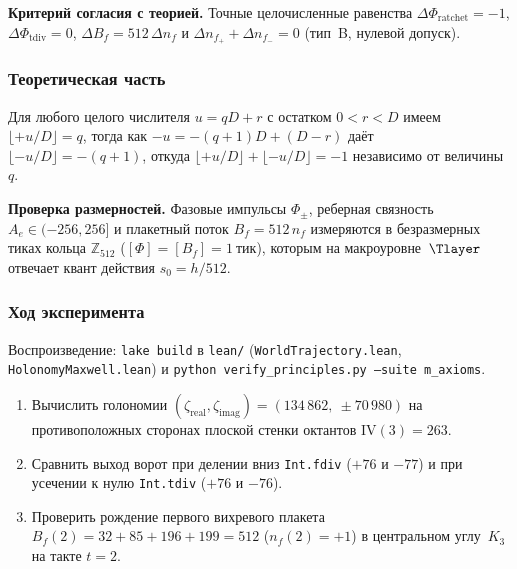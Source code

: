\textbf{Критерий согласия с теорией.}
Точные целочисленные равенства $\Delta\Phi_{\mathrm{ratchet}} = -1$, $\Delta\Phi_{\mathrm{tdiv}} = 0$, $\Delta B_f = 512\,\Delta n_f$ и $\Delta n_{f_+} + \Delta n_{f_-} = 0$ (тип~B, нулевой допуск).

\subsubsection*{Теоретическая часть}
Для любого целого числителя $u = qD + r$ с остатком $0 < r < D$ имеем $\lfloor +u/D\rfloor = q$, тогда как $-u = -(q+1)D + (D-r)$ даёт $\lfloor -u/D\rfloor = -(q+1)$, откуда $\lfloor +u/D\rfloor + \lfloor -u/D\rfloor = -1$ независимо от величины~$q$.

\textbf{Проверка размерностей.}
Фазовые импульсы $\Phi_\pm$, реберная связность $A_e \in (-256,256]$ и плакетный поток $B_f = 512\,n_f$ измеряются в безразмерных тиках кольца $\mathbb{Z}_{512}$ ($[\Phi] = [B_f] = 1\ \text{тик}$), которым на макроуровне~$\Tlayer$ отвечает квант действия $s_0 = h / 512$.

\subsubsection*{Ход эксперимента}
{\sloppy Воспроизведение: \texttt{lake build} в \texttt{lean/} (\texttt{WorldTrajectory.lean}, \texttt{HolonomyMaxwell.lean}) и \texttt{python verify\_principles.py --suite m\_axioms}.\par}

\begin{enumerate}[label=\textbf{Шаг \arabic*:},leftmargin=*,itemsep=0.35em]
\item Вычислить голономии $(\zeta_{\mathrm{real}},\zeta_{\mathrm{imag}}) = (134\,862,\ \pm 70\,980)$ на противоположных сторонах плоской стенки октантов $\mathrm{IV}(3)=263$.
\item Сравнить выход ворот при делении вниз \texttt{Int.fdiv} ($+76$ и $-77$) и при усечении к нулю \texttt{Int.tdiv} ($+76$ и $-76$).
\item Проверить рождение первого вихревого плакета $B_f(2) = 32 + 85 + 196 + 199 = 512$ ($n_f(2) = +1$) в центральном углу~$K_3$ на такте $t=2$.
\end{enumerate}

